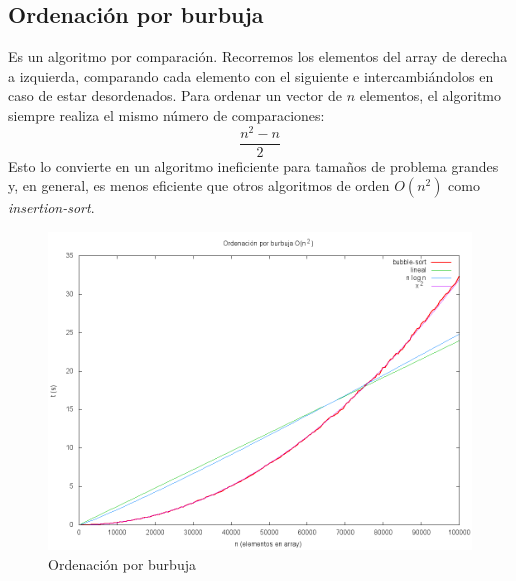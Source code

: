 \subsection{Ordenación por burbuja}
Es un algoritmo por comparación.  Recorremos los elementos del array de derecha a izquierda, comparando cada elemento con el siguiente e intercambiándolos en caso de estar desordenados.  Para ordenar un vector de $n$ elementos, el algoritmo siempre realiza el mismo número de comparaciones:
\[\frac{n^2 - n}{2}\]
Esto lo convierte en un algoritmo ineficiente para tamaños de problema grandes y, en general, es menos eficiente que otros algoritmos de orden $O(n^2)$ como \textit{insertion-sort}.
	\begin{figure}[H]
	  \centering
	    \includegraphics[width=1.0\textwidth]{bubble-sort.png}
	  \caption{Ordenación por burbuja}
	  \label{fig:bubble}
	\end{figure}

